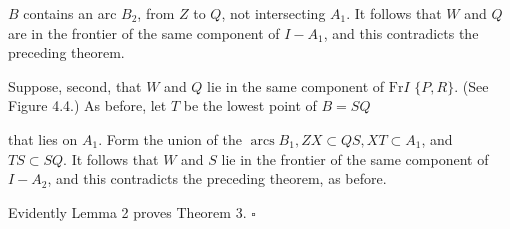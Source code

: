 $B$ contains an arc $B_{2}$, from $Z$ to $Q$, not intersecting $A_{1}$. It follows that $W$ and $Q$ are in the frontier of the same component of $I-A_{1}$, and this contradicts the preceding theorem.

Suppose, second, that $W$ and $Q$ lie in the same component of $\mathrm{Fr} I$ $\{P, R\}$. (See Figure 4.4.) As before, let $T$ be the lowest point of $B=S Q$

\begin{center}
\end{center}


that lies on $A_{1}$. Form the union of the $\operatorname{arcs} B_{1}, Z X \subset Q S, X T \subset A_{1}$, and $T S \subset S Q$. It follows that $W$ and $S$ lie in the frontier of the same component of $I-A_{2}$, and this contradicts the preceding theorem, as before.

Evidently Lemma 2 proves Theorem 3. \(\square\)
